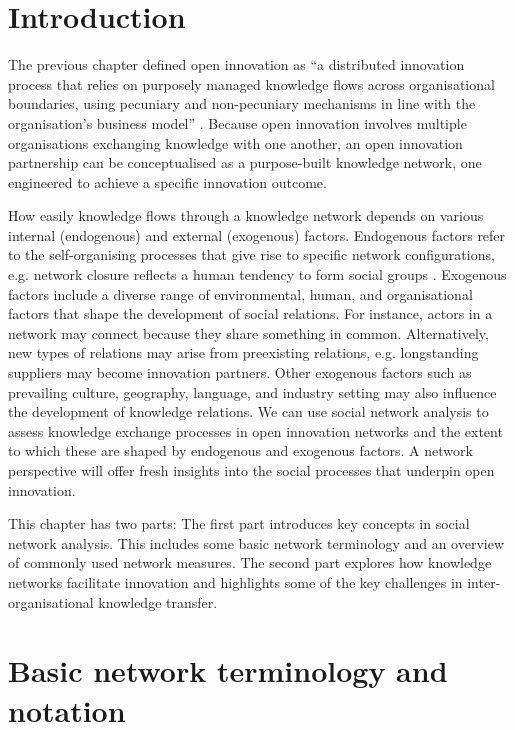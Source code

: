 \section{Introduction}

The previous chapter defined open innovation as \enquote{a distributed innovation process that relies on purposely managed knowledge flows across organisational boundaries, using pecuniary and non-pecuniary mechanisms in line with the organisation’s business model} \citep{chesbrough2014explicating}. Because open innovation involves multiple organisations exchanging knowledge with one another, an open innovation partnership can be conceptualised as a purpose\hyp{}built knowledge network, one engineered to achieve a specific innovation outcome. \medskip

How easily knowledge flows through a knowledge network depends on various internal (endogenous) and external (exogenous) factors. Endogenous factors refer to the self\hyp{}organising processes that give rise to specific network configurations, e.g. network closure reflects a human tendency to form social groups \citep{robins2015doing}. Exogenous factors include a diverse range of environmental, human, and organisational factors that shape the development of social relations. For instance, actors in a network may connect because they share something in common. Alternatively, new types of relations may arise from preexisting relations, e.g. longstanding suppliers may become innovation partners. Other exogenous factors such as prevailing culture, geography, language, and industry setting may also influence the development of knowledge relations. We can use social network analysis to assess knowledge exchange processes in open innovation networks and the extent to which these are shaped by endogenous and exogenous factors. A network perspective will offer fresh insights into the social processes that underpin open innovation. \medskip

This chapter has two parts: The first part introduces key concepts in social network analysis. This includes some basic network terminology and an overview of commonly used network measures. The second part explores how knowledge networks facilitate innovation and highlights some of the key challenges in inter\hyp{}organisational knowledge transfer. \medskip

\section{Basic network terminology and notation}

